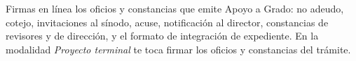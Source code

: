 \documentclass[11pt,a4paper]{article}
\begin{document}
{\small\tableofcontents}
\newpage
\begin{quevasahacer}
Firmas en línea los oficios y constancias que emite Apoyo a Grado: no adeudo, cotejo, invitaciones al sínodo, acuse, notificación al director, constancias de revisores y de dirección, y el formato de integración de expediente. En la modalidad \emph{Proyecto terminal} te toca firmar los oficios y constancias del trámite.
\end{quevasahacer}




\end{document}
